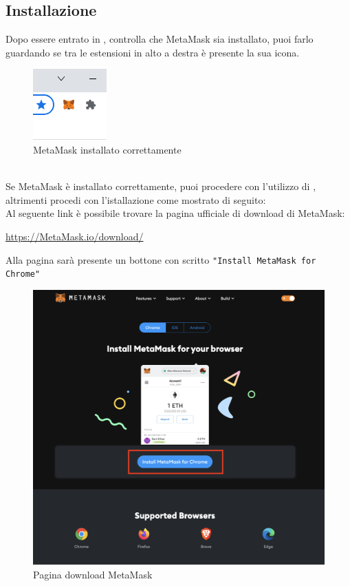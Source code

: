 \subsection{Installazione}
Dopo essere entrato in \projectName{}, controlla che MetaMask sia installato, puoi farlo guardando se tra le estensioni in alto a destra è presente la sua icona.
    \begin{figure}[H]
        \centering
        \includegraphics{immagini/MetaMask/MetaMask_installed.png}
        \caption{MetaMask installato correttamente}
    \end{figure}
\textbf{}\\
 Se MetaMask è installato correttamente, puoi procedere con l'utilizzo di \projectName, altrimenti procedi con l'istallazione come mostrato di seguito:\\
 Al seguente link è possibile trovare la pagina ufficiale di download di MetaMask:
 \begin{center}
     \url{https://MetaMask.io/download/}
 \end{center}
 Alla pagina sarà presente un bottone con scritto \texttt{"Install MetaMask for Chrome"}
 \begin{figure}[H]
    \centering
    \includegraphics[scale=0.3]{immagini/MetaMask/install-MetaMask.png}
    \caption{Pagina download MetaMask}
\end{figure}
